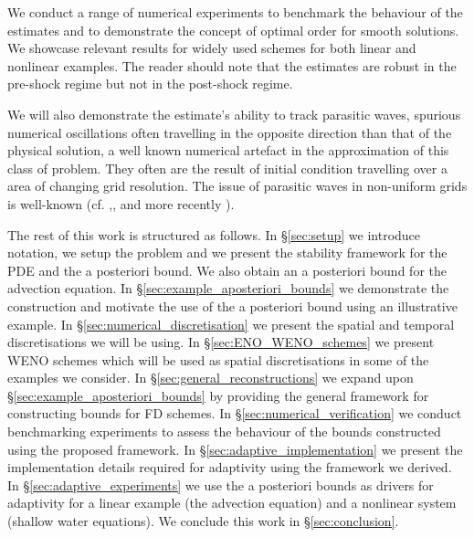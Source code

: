 \documentclass[final]{amsart}
\numberwithin{equation}{section}
\begin{document}
We conduct a range of numerical experiments to benchmark the behaviour
of the estimates and to demonstrate the concept of optimal order for
smooth solutions. We showcase relevant results for widely used schemes
for both linear and nonlinear examples.  The reader should note that
the estimates are robust in the pre-shock regime but not in the
post-shock regime.  

We will also demonstrate the estimate's ability to track parasitic
waves, spurious numerical oscillations often travelling in the
opposite direction than that of the physical solution, a well known
numerical artefact in the approximation of this class of problem.
They often are the result of initial condition travelling over a area
of changing grid resolution. The issue of parasitic waves in
non-uniform grids is well-known
(cf. \cite{vichnevetsky1981energy},\cite{vichnevetsky1981propagation},\cite{trefethen1982group}
and more recently \cite{long2011numerical}).  

The rest of this work is structured as follows.  In \S\ref{sec:setup}
we introduce notation, we setup the problem and we present the
stability framework for the PDE and the a posteriori bound.  We also
obtain an a posteriori bound for the advection equation.  In
\S\ref{sec:example_aposteriori_bounds} we demonstrate the construction
and motivate the use of the a posteriori bound using an illustrative
example.  In \S\ref{sec:numerical_discretisation} we present the
spatial and temporal discretisations we will be using.  In
\S\ref{sec:ENO_WENO_schemes} we present WENO schemes which will be
used as spatial discretisations in some of the examples we consider.
In \S\ref{sec:general_reconstructions} we expand upon
\S\ref{sec:example_aposteriori_bounds} by providing the general
framework for constructing bounds for FD schemes.  In
\S\ref{sec:numerical_verification} we conduct benchmarking experiments
to assess the behaviour of the bounds constructed using the proposed
framework.  In \S\ref{sec:adaptive_implementation} we present the
implementation details required for adaptivity using the framework we
derived.  In \S\ref{sec:adaptive_experiments} we use the a posteriori
bounds as drivers for adaptivity for a linear example (the advection
equation) and a nonlinear system (shallow water equations).  We
conclude this work in \S\ref{sec:conclusion}.
\end{document}
